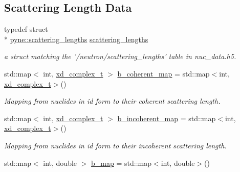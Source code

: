 \subsection*{Scattering Length Data}
\begin{DoxyCompactItemize}
\item 
\hypertarget{namespacepyne_a9a7904773bd3c8c5b8c4e10360c78c89}{typedef struct \\*
\hyperlink{structpyne_1_1scattering__lengths}{pyne\+::scattering\+\_\+lengths} \hyperlink{namespacepyne_a9a7904773bd3c8c5b8c4e10360c78c89}{scattering\+\_\+lengths}}\label{namespacepyne_a9a7904773bd3c8c5b8c4e10360c78c89}

\begin{DoxyCompactList}\small\item\em a struct matching the '/neutron/scattering\+\_\+lengths' table in nuc\+\_\+data.\+h5. \end{DoxyCompactList}\item 
\hypertarget{namespacepyne_a2bf1da1e7baf82a149d383b448cb4558}{std\+::map$<$ int, \hyperlink{structxd__complex__t}{xd\+\_\+complex\+\_\+t} $>$ \hyperlink{namespacepyne_a2bf1da1e7baf82a149d383b448cb4558}{b\+\_\+coherent\+\_\+map} = std\+::map$<$int, \hyperlink{structxd__complex__t}{xd\+\_\+complex\+\_\+t}$>$()}\label{namespacepyne_a2bf1da1e7baf82a149d383b448cb4558}

\begin{DoxyCompactList}\small\item\em Mapping from nuclides in id form to their coherent scattering length. \end{DoxyCompactList}\item 
\hypertarget{namespacepyne_a1206591ebb3e8305358495b8c8730b65}{std\+::map$<$ int, \hyperlink{structxd__complex__t}{xd\+\_\+complex\+\_\+t} $>$ \hyperlink{namespacepyne_a1206591ebb3e8305358495b8c8730b65}{b\+\_\+incoherent\+\_\+map} = std\+::map$<$int, \hyperlink{structxd__complex__t}{xd\+\_\+complex\+\_\+t}$>$()}\label{namespacepyne_a1206591ebb3e8305358495b8c8730b65}

\begin{DoxyCompactList}\small\item\em Mapping from nuclides in id form to their incoherent scattering length. \end{DoxyCompactList}\item 
\hypertarget{namespacepyne_ab4e41cc84fefb9085e62ad030a2b4ee6}{std\+::map$<$ int, double $>$ \hyperlink{namespacepyne_ab4e41cc84fefb9085e62ad030a2b4ee6}{b\+\_\+map} = std\+::map$<$int, double$>$()}\label{namespacepyne_ab4e41cc84fefb9085e62ad030a2b4ee6}


\end{DoxyCompactItemize}
